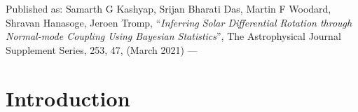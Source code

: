 {Published as: 
\textnormal{{\color{denimdarkblue} Samarth G Kashyap}, 
Srijan Bharati Das, Martin F Woodard, 
Shravan Hanasoge, Jeroen Tromp, 
``\emph{Inferring Solar Differential Rotation 
through Normal-mode Coupling Using Bayesian Statistics}'',
The Astrophysical Journal Supplement Series,} 253, 
\textnormal{47, (March 2021) --- \cite{SGK-2021-ApJS}}
}
\label{chap:p1-rotation-coupling}

\section{Introduction} \label{sec:p1-intro}
\lipsum

